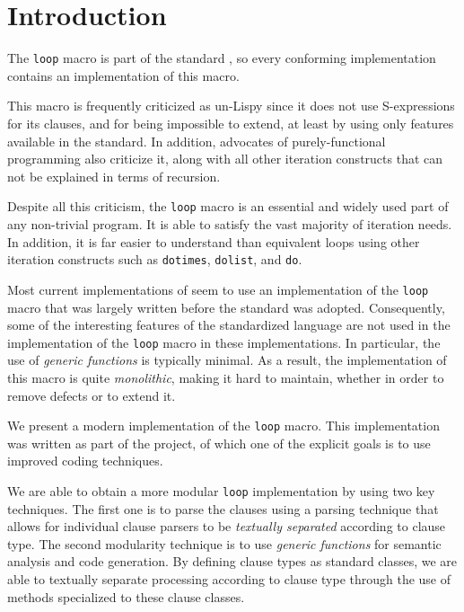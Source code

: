 \section{Introduction}
\label{sec-introduction}

The \texttt{loop} macro is part of the \commonlisp{} standard
\cite{ansi:common:lisp}, so every conforming \commonlisp{}
implementation contains an implementation of this macro.

This macro is frequently criticized as un-Lispy since it does not use
S-expressions for its clauses, and for being impossible to extend, at
least by using only features available in the \commonlisp{} standard.
In addition, advocates of purely-functional programming also criticize
it, along with all other iteration constructs that can not be
explained in terms of recursion.

Despite all this criticism, the \texttt{loop} macro is an essential
and widely used part of any non-trivial \commonlisp{} program.  It is
able to satisfy the vast majority of iteration needs.  In addition, it
is far easier to understand than equivalent loops using other
iteration constructs such as \texttt{dotimes}, \texttt{dolist}, and
\texttt{do}.

Most current implementations of \commonlisp{} seem to use an
implementation of the \texttt{loop} macro that was largely written
before the \commonlisp{} standard was adopted.  Consequently, some of
the interesting features of the standardized \commonlisp{} language
are not used in the implementation of the \texttt{loop} macro in
these implementations.  In particular, the use of \emph{generic
  functions} is typically minimal.  As a result, the implementation of
this macro is quite \emph{monolithic}, making it hard to maintain,
whether in order to remove defects or to extend it.

We present a modern implementation of the \texttt{loop} macro.  This
implementation was written as part of the \sicl{} project, of
which one of the explicit goals is to use improved coding techniques.

We are able to obtain a more modular \texttt{loop} implementation by
using two key techniques.  The first one is to parse the clauses using
a parsing technique that allows for individual clause parsers to be
\emph{textually separated} according to clause type.  The second
modularity technique is to use \emph{generic functions} for semantic
analysis and code generation.  By defining clause types as standard
classes, we are able to textually separate processing according to
clause type through the use of methods specialized to these clause
classes.
